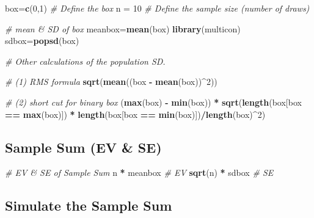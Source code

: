 \documentclass[]{article}
\newenvironment{Shaded}{\begin{snugshade}}{\end{snugshade}}
\newcommand{\CommentTok}[1]{\textcolor[rgb]{0.56,0.35,0.01}{\textit{#1}}}
\newcommand{\DecValTok}[1]{\textcolor[rgb]{0.00,0.00,0.81}{#1}}
\newcommand{\KeywordTok}[1]{\textcolor[rgb]{0.13,0.29,0.53}{\textbf{#1}}}
\newcommand{\NormalTok}[1]{#1}
\newcommand{\OperatorTok}[1]{\textcolor[rgb]{0.81,0.36,0.00}{\textbf{#1}}}
\newcommand{\StringTok}[1]{\textcolor[rgb]{0.31,0.60,0.02}{#1}}
\begin{document}
\begin{Shaded}
\begin{Highlighting}[]
\NormalTok{box=}\KeywordTok{c}\NormalTok{(}\DecValTok{0}\NormalTok{,}\DecValTok{1}\NormalTok{) }\CommentTok{# Define the box}
\NormalTok{n =}\StringTok{ }\DecValTok{10}  \CommentTok{# Define the sample size (number of draws)}

\CommentTok{# mean & SD of box}
\NormalTok{meanbox=}\KeywordTok{mean}\NormalTok{(box)}
\KeywordTok{library}\NormalTok{(multicon)}
\NormalTok{sdbox=}\KeywordTok{popsd}\NormalTok{(box)}

\CommentTok{# Other calculations of the population SD.}

\CommentTok{# (1) RMS formula}
\KeywordTok{sqrt}\NormalTok{(}\KeywordTok{mean}\NormalTok{((box }\OperatorTok{-}\StringTok{ }\KeywordTok{mean}\NormalTok{(box))}\OperatorTok{^}\DecValTok{2}\NormalTok{))}

\CommentTok{# (2) short cut for binary box}
\NormalTok{(}\KeywordTok{max}\NormalTok{(box) }\OperatorTok{-}\StringTok{ }\KeywordTok{min}\NormalTok{(box)) }\OperatorTok{*}\StringTok{ }\KeywordTok{sqrt}\NormalTok{(}\KeywordTok{length}\NormalTok{(box[box }\OperatorTok{==}\StringTok{ }\KeywordTok{max}\NormalTok{(box)]) }\OperatorTok{*}\StringTok{ }\KeywordTok{length}\NormalTok{(box[box }\OperatorTok{==}\StringTok{ }
\StringTok{    }\KeywordTok{min}\NormalTok{(box)])}\OperatorTok{/}\KeywordTok{length}\NormalTok{(box)}\OperatorTok{^}\DecValTok{2}\NormalTok{)}
\end{Highlighting}
\end{Shaded}

\hypertarget{sample-sum-ev-se}{%
\subsection{Sample Sum (EV \& SE)}\label{sample-sum-ev-se}}

\begin{Shaded}
\begin{Highlighting}[]
\CommentTok{# EV & SE of Sample Sum}
\NormalTok{n }\OperatorTok{*}\StringTok{ }\NormalTok{meanbox  }\CommentTok{# EV}
\KeywordTok{sqrt}\NormalTok{(n) }\OperatorTok{*}\StringTok{ }\NormalTok{sdbox  }\CommentTok{# SE}
\end{Highlighting}
\end{Shaded}

\hypertarget{simulate-the-sample-sum}{%
\subsection{Simulate the Sample Sum}\label{simulate-the-sample-sum}}
\end{document}
